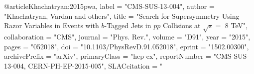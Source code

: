 @article{Khachatryan:2015pwa,
      label          = "CMS-SUS-13-004",
      author         = "Khachatryan, Vardan and others",
      title          = "{Search for Supersymmetry Using Razor Variables in Events
                        with $b$-Tagged Jets in $pp$ Collisions at $\sqrt{s} =$ 8
                        TeV}",
      collaboration  = "CMS",
      journal        = "Phys. Rev.",
      volume         = "D91",
      year           = "2015",
      pages          = "052018",
      doi            = "10.1103/PhysRevD.91.052018",
      eprint         = "1502.00300",
      archivePrefix  = "arXiv",
      primaryClass   = "hep-ex",
      reportNumber   = "CMS-SUS-13-004, CERN-PH-EP-2015-005",
      SLACcitation   = "%
}

